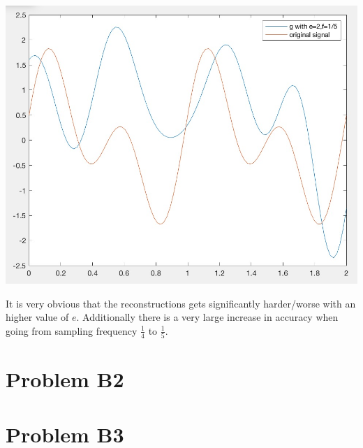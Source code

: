 \documentclass[12pt]{article}
\begin{document}
\begin{enumerate}[a)]
\begin{centering}
        \includegraphics[scale = 0.3]{figures/e20-f15}\\
        \end{centering}

        It is very obvious that the reconstructions gets significantly harder/worse with an higher value of $e$. Additionally there is a very large increase in accuracy when going from sampling frequency $\frac{1}{4}$ to $\frac{1}{5}$.

	
\end{enumerate}
\section*{Problem B2}


\section*{Problem B3}
\end{document}
